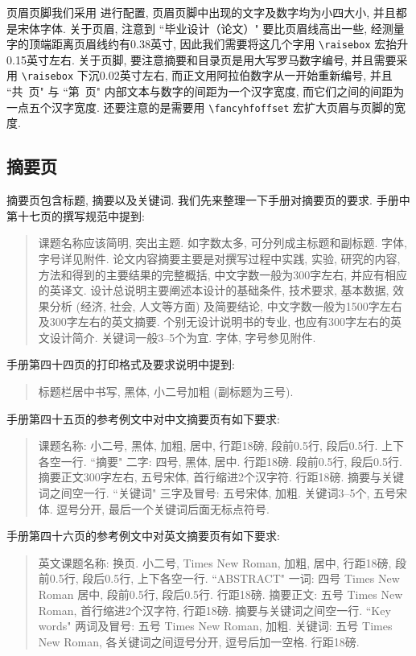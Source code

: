 页眉页脚我们采用  进行配置, 页眉页脚中出现的文字及数字均为小四大小, 并且都是宋体字体. 关于页眉, 注意到 ``毕业设计（论文）" 要比页眉线高出一些, 经测量字的顶端距离页眉线约有0.38英寸, 因此我们需要将这几个字用 \verb|\raisebox| 宏抬升0.15英寸左右. 关于页脚, 要注意摘要和目录页是用大写罗马数字编号, 并且需要采用 \verb|\raisebox| 下沉0.02英寸左右, 而正文用阿拉伯数字从一开始重新编号, 并且 ``共\ 页" 与 ``第\ 页" 内部文本与数字的间距为一个汉字宽度, 而它们之间的间距为一点五个汉字宽度. 还要注意的是需要用 \verb|\fancyhfoffset| 宏扩大页眉与页脚的宽度.

\subsection{摘要页}

摘要页包含标题, 摘要以及关键词. 我们先来整理一下手册对摘要页的要求. 手册中第十七页的撰写规范中提到:
\begin{quote}
  课题名称应该简明, 突出主题. 如字数太多, 可分列成主标题和副标题. 字体, 字号详见附件.
  论文内容摘要主要是对撰写过程中实践, 实验, 研究的内容, 方法和得到的主要结果的完整概括, 中文字数一般为300字左右, 并应有相应的英译文.
  设计总说明主要阐述本设计的基础条件, 技术要求, 基本数据, 效果分析 (经济, 社会, 人文等方面) 及简要结论, 中文字数一般为1500字左右及300字左右的英文摘要. 个别无设计说明书的专业, 也应有300字左右的英文设计简介.
  关键词一般3--5个为宜. 字体, 字号参见附件.
\end{quote}
手册第四十四页的打印格式及要求说明中提到:
\begin{quote}
  标题栏居中书写, 黑体, 小二号加粗 (副标题为三号).
\end{quote}
手册第四十五页的参考例文中对中文摘要页有如下要求:
\begin{quote}
  课题名称: 小二号, 黑体, 加粗, 居中, 行距18磅, 段前0.5行, 段后0.5行. 上下各空一行.
  ``摘要" 二字: 四号, 黑体, 居中. 行距18磅. 段前0.5行, 段后0.5行.
  摘要正文300字左右, 五号宋体, 首行缩进2个汉字符. 行距18磅.
  摘要与关键词之间空一行.
  ``关键词" 三字及冒号: 五号宋体, 加粗.
  关键词3--5个, 五号宋体. 逗号分开, 最后一个关键词后面无标点符号.
\end{quote}
手册第四十六页的参考例文中对英文摘要页有如下要求:
\begin{quote}
  英文课题名称: 换页. 小二号, Times New Roman, 加粗, 居中, 行距18磅, 段前0.5行, 段后0.5行, 上下各空一行.
  ``ABSTRACT" 一词: 四号 Times New Roman 居中, 段前0.5行, 段后0.5行. 行距18磅.
  摘要正文: 五号 Times New Roman, 首行缩进2个汉字符, 行距18磅.
  摘要与关键词之间空一行.
  ``Key words" 两词及冒号: 五号 Times New Roman, 加粗.
  关键词: 五号 Times New Roman, 各关键词之间逗号分开, 逗号后加一空格. 行距18磅.
\end{quote}

